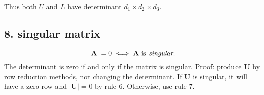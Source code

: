\documentclass[11pt, oneside]{article}
\begin{document}
Thus both $U$ and $L$ have determinant $d_1 \times d_2 \times d_3$.

\subsection*{8. singular matrix}
\[
|\mathbf{A}| = 0 \iff \mathbf{A} \text{ is \emph{singular}.}
\]
The determinant is zero if and only if the matrix is singular.  Proof:  produce $\mathbf{U}$ by row reduction methods, not changing the determinant.  If $\mathbf{U}$ is singular, it will have a zero row and $|\mathbf{U}| = 0$ by rule 6.  Otherwise, use rule 7.
\end{document}
